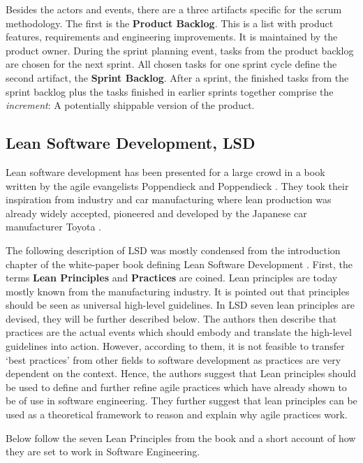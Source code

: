 \documentclass[a4paper,11pt,twoside]{article}
\begin{document}
Besides the actors and events, there are a three artifacts specific for the scrum methodology. The first is the \textbf{Product Backlog}. This is a list with product features, requirements and engineering improvements. It is maintained by the product owner. During the sprint planning event, tasks from the product backlog are chosen for the next sprint. All chosen tasks for one sprint cycle define the second artifact, the \textbf{Sprint Backlog}. After a sprint, the finished tasks from the sprint backlog plus the tasks finished in earlier sprints together comprise the \textit{increment}: A potentially shippable version of the product.  



\subsection{Lean Software Development, LSD}
Lean software development has been presented for a large crowd in a book written by the agile evangelists Poppendieck and Poppendieck \cite{poppendieck2003}. They took their inspiration from industry and car manufacturing where lean production was already widely accepted, pioneered and developed by the Japanese car manufacturer Toyota \cite{toyota}.

The following description of LSD was mostly condensed from the introduction chapter of the white-paper book defining Lean Software Development \cite{poppendieck2003}. First, the terms \textbf{Lean Principles} and \textbf{Practices} are coined. Lean principles are today mostly known from the manufacturing industry. It is pointed out that principles should be seen as universal high-level guidelines. In LSD seven lean principles are devised, they will be further described below. The authors then describe that practices are the actual events which should embody and translate the high-level guidelines into action. However, according to them, it is not feasible to transfer `best practices' from other fields to software development as practices are very dependent on the context. Hence, the authors suggest that Lean principles should be used to define and further refine agile practices which have already shown to be of use in software engineering. They further suggest that lean principles can be used as a theoretical framework to reason and explain why agile practices work.

Below follow the seven Lean Principles from the book and a short account of how they are set to work in Software Engineering.
\end{document}
